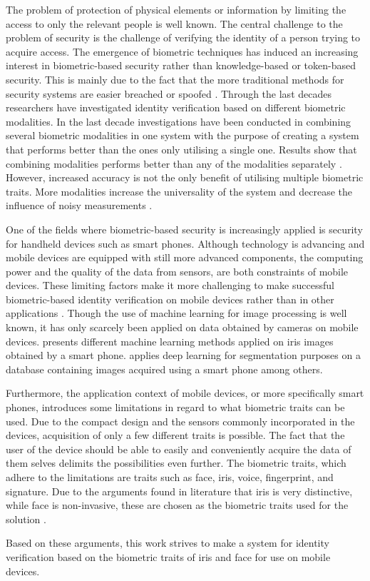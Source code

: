 The problem of protection of physical elements or information by limiting the access to only the relevant people is well known. The central challenge to the problem of security is the challenge of verifying the identity of a person trying to acquire access. The emergence of biometric techniques has induced an increasing interest in biometric-based security rather than knowledge-based or token-based security. This is mainly due to the fact  that the more traditional methods for security systems are easier breached or spoofed \citep{Ross2003}. Through the last decades researchers have investigated identity verification based on different biometric modalities. In the last decade investigations have been conducted in combining several biometric modalities in one system with the purpose of creating a system that performs better than the ones only utilising a single one. Results show that combining modalities performs better than any of the modalities separately \citep{Chen2005a}.  However, increased accuracy is not the only benefit of utilising multiple biometric traits. More modalities increase the universality of the system and decrease the influence of noisy measurements \citep{Ross2003}.

One of the fields where biometric-based security is increasingly applied is security for handheld devices such as smart phones. Although technology is advancing and mobile devices are equipped with still more advanced components, the computing power and the quality of the data from sensors, are both constraints of mobile devices. These limiting factors make it more challenging to make successful biometric-based identity verification on mobile devices rather than in other applications \citep{Kim2016}. Though the use of machine learning for image processing is well known, it has only scarcely been applied on data obtained by cameras on mobile devices. \cite{Khan2017a} presents different machine learning methods applied on iris images obtained by a smart phone. \cite{Bazrafkan2017} applies deep learning for segmentation purposes on a database containing images acquired using a smart phone among others. 

Furthermore, the application context of mobile devices, or more specifically smart phones, introduces some limitations in regard to what biometric traits can be used. Due to the compact design and the sensors commonly incorporated in the devices, acquisition of only a few different traits is possible. The fact that the user of the device should be able to easily and conveniently acquire the data of them selves delimits the possibilities even further. The biometric traits, which adhere to the limitations are traits such as face, iris, voice, fingerprint, and signature. Due to the arguments found in literature that iris is very distinctive, while face is non-invasive, these are chosen as the biometric traits used for the solution \citep{Wang2009a}. 

Based on these arguments, this work strives to make a system for identity verification based on the biometric traits of iris and face for use on mobile devices.